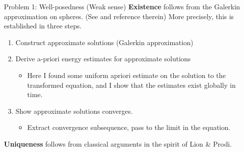\documentclass[xcolor=dvipsnames,leqno]{beamer}
\begin{document}
\begin{frame}{Problem 1: Well-posedness (Weak sense)}
\textbf{Existence} follows from the Galerkin approximation on spheres. (See \cite{MR3306386} and reference therein) More precisely, this is established in three steps.
	\begin{enumerate}
		\item Construct approximate solutions (Galerkin approximation)

		\item Derive a-priori energy estimates for approximate solutions
			\begin{itemize}
				\item Here I found some uniform apriori estimate on the solution to the transformed equation, and I show that the estimates exist globally in time.
			\end{itemize}
		\item Show approximate solutions converges.
			\begin{itemize}
				\item Extract convergence subsequence, pass to the limit in the equation.
			\end{itemize}
	\end{enumerate}
\textbf{Uniqueness} follows from classical arguments in the spirit of Lion \& Prodi.
\end{frame}  
\end{document}
